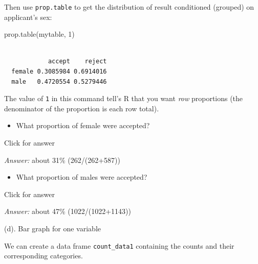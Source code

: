 \documentclass[
]{book}
\newenvironment{Shaded}{\begin{snugshade}}{\end{snugshade}}
\newcommand{\DecValTok}[1]{\textcolor[rgb]{0.00,0.00,0.81}{#1}}
\newcommand{\FunctionTok}[1]{\textcolor[rgb]{0.00,0.00,0.00}{#1}}
\newcommand{\NormalTok}[1]{#1}
\newcommand{\OtherTok}[1]{\textcolor[rgb]{0.56,0.35,0.01}{#1}}
\newcommand{\SpecialCharTok}[1]{\textcolor[rgb]{0.00,0.00,0.00}{#1}}
\providecommand{\tightlist}{%
  \setlength{\itemsep}{0pt}\setlength{\parskip}{0pt}}
\begin{document}
\begin{Shaded}
\end{Shaded}

Then use \texttt{prop.table} to get the distribution of result conditioned (grouped) on applicant's sex:

\begin{Shaded}
\begin{Highlighting}[]
\FunctionTok{prop.table}\NormalTok{(mytable, }\DecValTok{1}\NormalTok{)}
\end{Highlighting}
\end{Shaded}

\begin{verbatim}
        
            accept    reject
  female 0.3085984 0.6914016
  male   0.4720554 0.5279446
\end{verbatim}

The value of \texttt{1} in this command tell's R that you want \emph{row} proportions (the denominator of the proportion is each row total).

\begin{itemize}
\tightlist
\item
  What proportion of female were accepted?
\end{itemize}

Click for answer

\emph{Answer:} about 31\% (262/(262+587))

\begin{itemize}
\tightlist
\item
  What proportion of males were accepted?
\end{itemize}

Click for answer

\emph{Answer:} about 47\% (1022/(1022+1143))

(d). Bar graph for one variable

We can create a data frame \texttt{count\_data1} containing the counts and their corresponding categories.

\begin{Shaded}
\end{Shaded}
\end{document}
